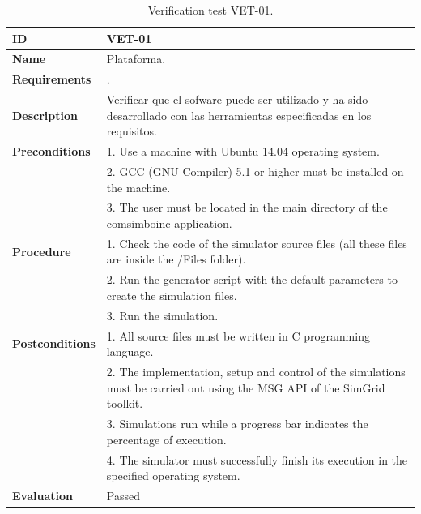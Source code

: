 \begin{center}
\begin{table}[htb]
\centering
\begin{tabular}{@{}p{2.5cm} p{13cm}@{}} 
\toprule
\textbf{ID} 					& VET-01 \\
\midrule
\textbf{Name} 				& Plataforma. \\
\midrule
\textbf{Requirements} 		& . \\
\midrule
\textbf{Description} 		& Verificar que el sofware puede ser utilizado y ha sido desarrollado con las herramientas especificadas en los requisitos. \\
\midrule
\textbf{Preconditions}		& 1. Use a machine with Ubuntu 14.04 operating system.\\
							& 2. GCC (GNU Compiler) 5.1 or higher must be installed on the machine. \\
							& 3. The user must be located in the main directory of the \gls{comsimboinc} application. \\
\midrule
\textbf{Procedure}			& 1. Check the code of the simulator source files (all these files are inside the /Files folder). \\
							& 2. Run the generator script with the default parameters to create the simulation files.\\
							& 3. Run the simulation.\\
\midrule
\textbf{Postconditions} 		& 1. All source files must be written in C programming language.\\
							& 2. The implementation, setup and control of the simulations must be carried out using the MSG API of the SimGrid toolkit.\\
							& 3. Simulations run while a progress bar indicates the percentage of execution. \\			
							& 4. The simulator must successfully finish its execution in the specified operating system. \\
\midrule
\textbf{Evaluation} 			& Passed \\
\bottomrule
\end{tabular}
\caption{Verification test VET-01.}
\label{tab:vet01}
\end{table}
\end{center}


